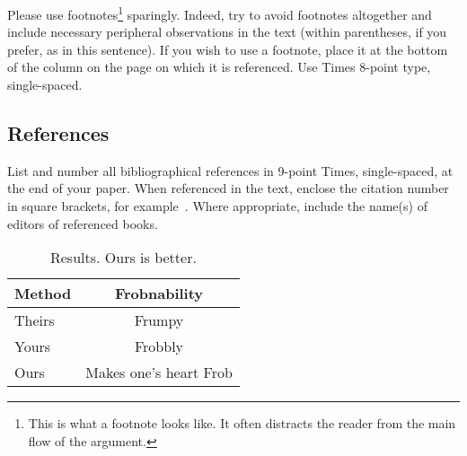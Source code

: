 \documentclass[10pt,twocolumn,letterpaper]{article}
\begin{document}
Please use footnotes\footnote {This is what a footnote looks like.  It
often distracts the reader from the main flow of the argument.} sparingly.
Indeed, try to avoid footnotes altogether and include necessary peripheral
observations in
the text (within parentheses, if you prefer, as in this sentence).  If you
wish to use a footnote, place it at the bottom of the column on the page on
which it is referenced. Use Times 8-point type, single-spaced.


\subsection{References}

List and number all bibliographical references in 9-point Times,
single-spaced, at the end of your paper. When referenced in the text,
enclose the citation number in square brackets, for
example~\cite{Authors14}.  Where appropriate, include the name(s) of
editors of referenced books.

\begin{table}
\begin{center}
\begin{tabular}{|l|c|}
\hline
Method & Frobnability \\
\hline\hline
Theirs & Frumpy \\
Yours & Frobbly \\
Ours & Makes one's heart Frob\\
\hline
\end{tabular}
\end{center}
\caption{Results.   Ours is better.}
\end{table}

{\small


}
\end{document}
